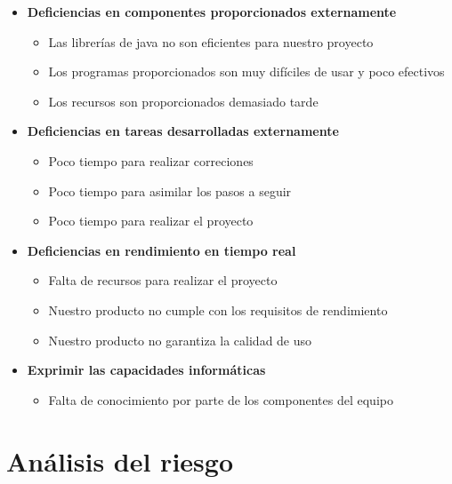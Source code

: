 \documentclass[spanish,a4paper,12pt]{report}	%
\begin{document}
\begin{itemize}
\begin{itemize}
	\end{itemize}
\item \textbf {Deficiencias en componentes proporcionados externamente}
	\begin{itemize}
		\item {Las librerías de java no son eficientes para nuestro proyecto}
		\item {Los programas proporcionados son muy difíciles de usar y poco efectivos}
		\item {Los recursos son proporcionados demasiado tarde}

	\end{itemize}
\item \textbf {Deficiencias en tareas desarrolladas externamente}
	\begin{itemize}
		\item {Poco tiempo para realizar correciones}
		\item {Poco tiempo para asimilar los pasos a seguir}
		\item {Poco tiempo para realizar el proyecto}
	\end{itemize}
\item \textbf {Deficiencias en rendimiento en tiempo real}
	\begin{itemize}
		\item {Falta de recursos para realizar el proyecto}
		\item {Nuestro producto no cumple con los requisitos de rendimiento}
		\item {Nuestro producto no garantiza la calidad de uso}
	\end{itemize}
\item \textbf {Exprimir las capacidades informáticas}
	\begin{itemize}
		\item {Falta de conocimiento por parte de los componentes del equipo}
	\end{itemize}
\end{itemize}


\newpage
\mbox{}
\thispagestyle{empty}						%
\newpage

\part{Análisis del riesgo}
\end{document}
